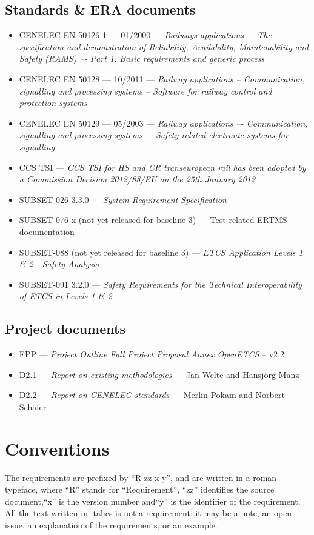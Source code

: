 \documentclass{template/openetcs_article}
\begin{document}
\subsection{Standards \& ERA documents}
\label{standards}
\begin{itemize}
\item CENELEC EN 50126-1 --- 01/2000 --- \emph{Railways applications –- The specification and 
demonstration of Reliability, Availability, Maintenability and Safety (RAMS) –- Part 1: 
Basic requirements and generic process}
\item CENELEC EN 50128 --- 10/2011 --- \emph{Railway applications -- Communication, signalling and 
processing systems -- Software for railway control and protection systems}
\item CENELEC EN 50129 --- 05/2003 --- \emph{Railway applications –- Communication, signalling and 
processing systems –- Safety related electronic systems for signalling}
\item CCS TSI --- \emph{ CCS TSI for HS and CR transeuropean rail has been adopted by a Commission Decision 2012/88/EU on the 25th January 2012}
\item SUBSET-026 3.3.0 --- \emph{System Requirement Specification}
\item SUBSET-076-x (not yet released for baseline 3) --- Test related ERTMS documentation
\item SUBSET-088 (not yet released for baseline 3) --- \emph{ETCS Application Levels 1 \& 2 - Safety Analysis}
\item SUBSET-091 3.2.0 --- \emph{Safety Requirements for the Technical Interoperability
of ETCS in Levels 1 \& 2}
\end{itemize}
\subsection{Project documents}
\begin{itemize}
\item FPP --- \emph{Project Outline Full Project Proposal Annex OpenETCS} -- v2.2
\item D2.1 --- \emph{Report on existing methodologies} --- Jan Welte and Hansj\"org Manz
\item D2.2 --- \emph{Report on CENELEC standards} --- Merlin Pokam and Norbert Sch\"afer
\end{itemize}

\section{Conventions}
The requirements are prefixed by “R-zz-x-y”, and are written in a roman typeface, where ``R'' 
stands for ``Requirement'', ``zz'' identifies the source document,``x'' 
is the version number and``y'' is the identifier of the requirement. All the text 
written in italics is not a requirement: it may be a note, an open issue, an 
explanation of the requirements, or an example.
\end{document}
